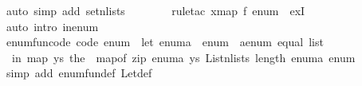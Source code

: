 \begin{isabellebody}
\ {\isacharparenleft}{\kern0pt}auto\ simp\ add{\isacharcolon}{\kern0pt}\ set{\isacharunderscore}{\kern0pt}n{\isacharunderscore}{\kern0pt}lists{\isacharparenright}{\kern0pt}\isanewline
\ \ \ \ \ \ \isamarkupfalse%
\ {\isacharparenleft}{\kern0pt}rule{\isacharunderscore}{\kern0pt}tac\ x{\isacharequal}{\kern0pt}{\isachardoublequoteopen}map\ f\ enum{\isachardoublequoteclose}\ \ exI{\isacharparenright}{\kern0pt}\isanewline
\ \ \ \ \ \ \isamarkupfalse%
\ {\isacharparenleft}{\kern0pt}auto\ intro{\isacharbang}{\kern0pt}{\isacharcolon}{\kern0pt}\ in{\isacharunderscore}{\kern0pt}enum{\isacharparenright}{\kern0pt}\isanewline
\ \ \ \ \ \ \isamarkupfalse%
\isanewline
\ \ \isamarkupfalse%
\isanewline
{}\isamarkupfalse%
%
\endisatagproof
{\isafoldproof}%
%
\isadelimproof
%
\endisadelimproof
\isanewline
\isanewline
{}\isamarkupfalse%
\isanewline
\isanewline
{}\isamarkupfalse%
\ enum{\isacharunderscore}{\kern0pt}fun{\isacharunderscore}{\kern0pt}code\ {\isacharbrackleft}{\kern0pt}code{\isacharbrackright}{\kern0pt}{\isacharcolon}{\kern0pt}\ {\isachardoublequoteopen}enum\ {\isacharequal}{\kern0pt}\ {\isacharparenleft}{\kern0pt}let\ enum{\isacharunderscore}{\kern0pt}a\ {\isacharequal}{\kern0pt}\ {\isacharparenleft}{\kern0pt}enum\ {\isacharcolon}{\kern0pt}{\isacharcolon}{\kern0pt}\ {\isacharprime}{\kern0pt}a{\isacharcolon}{\kern0pt}{\isacharcolon}{\kern0pt}{\isacharbraceleft}{\kern0pt}enum{\isacharcomma}{\kern0pt}\ equal{\isacharbraceright}{\kern0pt}\ list{\isacharparenright}{\kern0pt}\isanewline
\ \ in\ map\ {\isacharparenleft}{\kern0pt}{\isasymlambda}ys{\isachardot}{\kern0pt}\ the\ {\isasymcirc}\ map{\isacharunderscore}{\kern0pt}of\ {\isacharparenleft}{\kern0pt}zip\ enum{\isacharunderscore}{\kern0pt}a\ ys{\isacharparenright}{\kern0pt}{\isacharparenright}{\kern0pt}\ {\isacharparenleft}{\kern0pt}List{\isachardot}{\kern0pt}n{\isacharunderscore}{\kern0pt}lists\ {\isacharparenleft}{\kern0pt}length\ enum{\isacharunderscore}{\kern0pt}a{\isacharparenright}{\kern0pt}\ enum{\isacharparenright}{\kern0pt}{\isacharparenright}{\kern0pt}{\isachardoublequoteclose}\isanewline
%
\isadelimproof
\ \ %
\endisadelimproof
%
\isatagproof
{}\isamarkupfalse%
\ {\isacharparenleft}{\kern0pt}simp\ add{\isacharcolon}{\kern0pt}\ enum{\isacharunderscore}{\kern0pt}fun{\isacharunderscore}{\kern0pt}def\ Let{\isacharunderscore}{\kern0pt}def{\isacharparenright}{\kern0pt}%
\endisatagproof
{\isafoldproof}%
%
\isadelimproof
\isanewline
%
\endisadelimproof
\isanewline
{}\isamarkupfalse%

\end{isabellebody}

